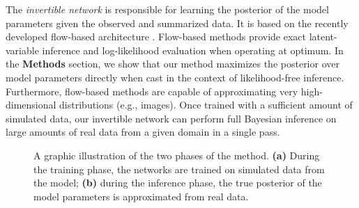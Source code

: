 \documentclass[9pt,twoside,lineno]{pnas-new}
\begin{document}
The \textit{invertible network} is responsible for learning the posterior of the model parameters given the observed and summarized data. It is based on the recently developed flow-based architecture \cite{kingma2018glow, grover2018flow, dinh2016density}. Flow-based methods provide exact latent-variable inference and log-likelihood evaluation when operating at optimum. In the \textbf{Methods} section, we show that our method maximizes the posterior over model parameters directly when cast in the context of likelihood-free inference. Furthermore, flow-based methods are capable of approximating very high-dimensional distributions (e.g., images). Once trained with a sufficient amount of simulated data, our invertible network can perform full Bayesian inference on large amounts of real data from a given domain in a single pass. 

\begin{figure}
    \centering
    \newline
    \caption{A graphic illustration of the two phases of the method. \textbf{(a)} During the training phase, the networks are trained on simulated data from the model; \textbf{(b)} during the inference phase, the true posterior of the model parameters is approximated from real data.}
    \label{fig:first}
\end{figure}
\end{document}
